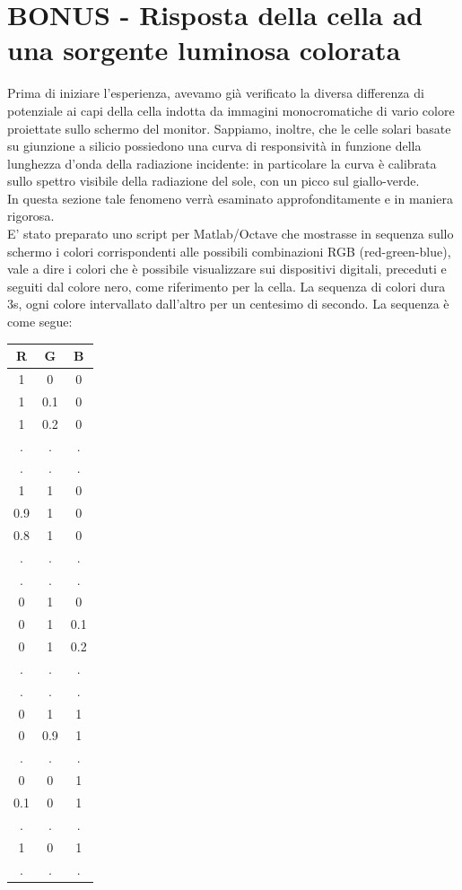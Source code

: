 \documentclass[journal, a4paper]{IEEEtran}
\begin{document}
\section{BONUS - Risposta della cella ad una sorgente luminosa colorata}
Prima di iniziare l'esperienza, avevamo già verificato la diversa differenza di potenziale ai capi della cella indotta da immagini monocromatiche di vario colore proiettate sullo schermo del monitor. Sappiamo, inoltre, che le celle solari basate su giunzione a silicio possiedono una curva di responsività in funzione della lunghezza d'onda della radiazione incidente: in particolare la curva è calibrata sullo spettro visibile della radiazione del sole, con un picco sul giallo-verde.\\
In questa sezione tale fenomeno verrà esaminato approfonditamente e in maniera rigorosa.\\

E' stato preparato uno script per Matlab/Octave che mostrasse in sequenza sullo schermo i colori corrispondenti alle possibili combinazioni RGB (red-green-blue), vale a dire i colori che è possibile visualizzare sui dispositivi digitali, preceduti e seguiti dal colore nero, come riferimento per la cella. La sequenza di colori dura 3s, ogni colore intervallato dall'altro per un centesimo di secondo. La sequenza è come segue:\\

\begin{table}
\centering
\begin{tabular}{|c|c|c|}
\hline \textbf{R} &\textbf{ G} & \textbf{B} \\ 
\hline 1 & 0 & 0 \\ 
\hline 1 & 0.1 & 0 \\ 
\hline 1 & 0.2 & 0 \\ 
\hline . & . & . \\ 
\hline . & . & . \\ 
\hline 1 & 1 & 0 \\ 
\hline 0.9 & 1 & 0 \\ 
\hline 0.8 & 1 & 0 \\ 
\hline . & . & . \\ 
\hline . &.  & . \\ 
\hline 0 & 1 & 0 \\ 
\hline 0 & 1 & 0.1 \\ 
\hline 0 & 1 & 0.2 \\ 
\hline . & . & . \\ 
\hline . & . & . \\ 
\hline 0 & 1 & 1 \\ 
\hline 0 & 0.9 & 1 \\ 
\hline . & . & . \\ 
\hline 0 & 0 & 1 \\ 
\hline 0.1 & 0 & 1 \\ 
\hline . & . & . \\ 
\hline 1 & 0 & 1 \\ 
\hline . & . & . \\ 
\hline 
\end{tabular} 
\end{table}
~\\
\end{document}
